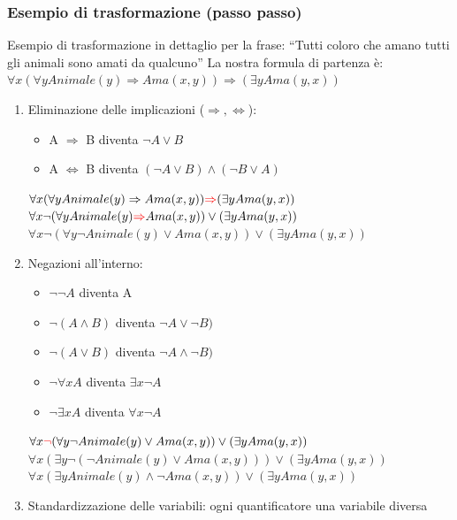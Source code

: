 \documentclass{article}
\begin{document}
\subsubsection{Esempio di trasformazione (passo passo)}
Esempio di trasformazione in dettaglio per la frase: \newline
“Tutti coloro che amano tutti gli animali sono amati da qualcuno” \newline 
La nostra formula di partenza è: $\forall x ( \forall y Animale(y) \Rightarrow Ama(x,y)) \Rightarrow (\exists y Ama(y, x))$
\begin{enumerate}
    \item Eliminazione delle implicazioni ($\Rightarrow, \Leftrightarrow$):
        \begin{itemize}
            \item A $\Rightarrow$ B diventa	$\neg A \lor B$
            \item A $\Leftrightarrow$ B diventa $(\neg A \lor B) \land (\neg B \lor A)$
        \end{itemize}
    $\forall x (\forall y Animale(y) \Rightarrow Ama(x,y)) \textcolor{red}{\Rightarrow} (\exists y Ama(y, x))$ \newline
    $\forall x \neg (\forall y Animale(y) \textcolor{red}{\Rightarrow} Ama(x,y)) \lor (\exists y Ama(y, x))$ \newline
    $\forall x \neg (\forall y \neg Animale(y) \lor Ama(x,y)) \lor (\exists y Ama(y, x))$
    \item Negazioni all'interno:
        \begin{itemize}
            \item $\neg \neg A$ diventa A
            \item $\neg (A \land B)$ diventa $\neg A \lor \neg B)$
            \item $\neg (A \lor B)$ diventa $\neg A \land \neg B)$
            \item $\neg \forall x A$ diventa $\exists x \neg A$
            \item $\neg \exists x A $ diventa $\forall x \neg A$
        \end{itemize}
    $\forall x \textcolor{red}{\neg} (\forall y \neg Animale(y) \lor Ama(x,y)) \lor (\exists y Ama(y, x))$ \newline
    $\forall x (\exists y \neg (\neg Animale(y) \lor Ama(x,y))) \lor (\exists y Ama(y, x))$ \newline
    $\forall x (\exists y Animale(y) \land \neg Ama(x,y)) \lor (\exists y Ama(y, x))$
    \item Standardizzazione delle variabili: ogni quantificatore una variabile diversa \newline

\end{enumerate}
\end{document}
